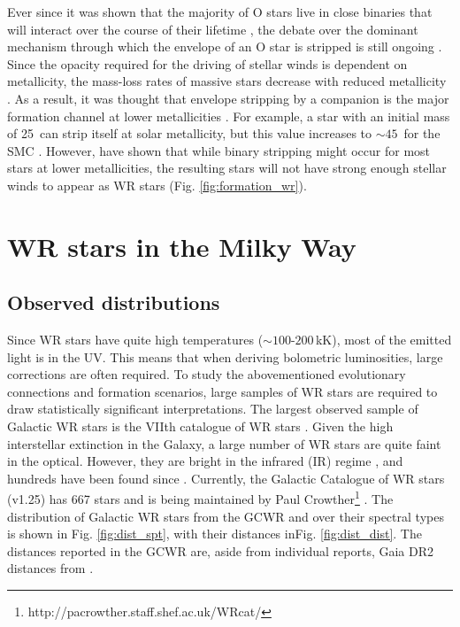 Ever since it was shown that the majority of O stars live in close binaries that will interact over the course of their lifetime \citep{sana_binary_2012,sota_galactic_2014}, the debate over the dominant mechanism through which the envelope of an O star is stripped is still ongoing \citep{vanbeveren_wr_1998,shenar_wolf-rayet_2019,shenar_why_2020}. Since the opacity required for the driving of stellar winds is dependent on metallicity, the mass-loss rates of massive stars decrease with reduced metallicity \citep{vink_mass-loss_2001,vink_metallicity_2005,hainich_wolf-rayet_2015,shenar_wolf-rayet_2019}. As a result, it was thought that envelope stripping by a companion is the major formation channel at lower metallicities \citep{maeder_new_1994,smith_mass_2014,groh_grids_2019}. For example, a star with an initial mass of 25\,\Msun{} can strip itself at solar metallicity, but this value increases to ${\sim}45\,$\Msun{} for the SMC \citep{meynet_stellar_2003,meynet_stellar_2005}. However, \citet{shenar_why_2020} have shown that while binary stripping might occur for most stars at lower metallicities, the resulting stars will not have strong enough stellar winds to appear as WR stars (Fig. \ref{fig:formation_wr}). 

\section{WR stars in the Milky Way}

\subsection{Observed distributions}

Since WR stars have quite high temperatures (${\sim}100$-$200\,$kK), most of the emitted light is in the UV. This means that when deriving bolometric luminosities, large corrections are often required. To study the abovementioned evolutionary connections and formation scenarios, large samples of WR stars are required to draw statistically significant interpretations. The largest observed sample of Galactic WR stars is the VIIth catalogue of WR stars \citep[][henceforth ]{van_der_hucht_viith_2001}. Given the high interstellar extinction in the Galaxy, a large number of WR stars are quite faint in the optical. However, they are bright in the infrared (IR) regime \citep{rosslowe_spatial_2015}, and hundreds have been found since \citep{mauerhan_12_2009,shara_near-infrared_2009,shara_near-infrared_2012,faherty_characterizing_2014,rosslowe_deep_2018}. Currently, the Galactic Catalogue of WR stars (v1.25) has 667 stars and is being maintained by Paul Crowther\footnote{http://pacrowther.staff.shef.ac.uk/WRcat/} \citep[][henceforth GCWR]{rosslowe_spatial_2015,rate_unlocking_2020}. The distribution of Galactic WR stars from the GCWR and  over their spectral types is shown in Fig. \ref{fig:dist_spt}, with their distances inFig. \ref{fig:dist_dist}. The distances reported in the GCWR are, aside from individual reports, Gaia DR2 distances from \citet{rate_unlocking_2020}. 


